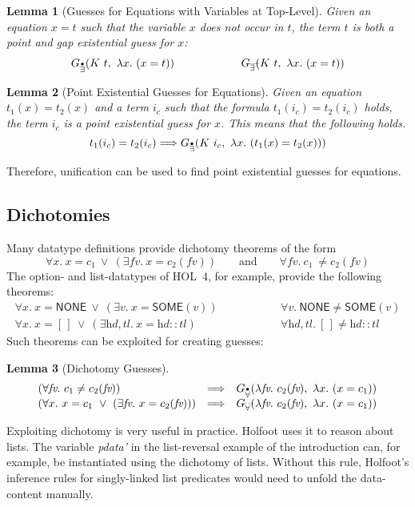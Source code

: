 \documentclass[a4paper,12pt,DIV=12,oneside]{scrbook}
\newcommand{\fv}{\textit{fv}}
\newtheorem{lemma}{Lemma}[section]
\theoremstyle{definition}
\theoremstyle{remark}
\newcommand{\GEP}{\ensuremath{G_{\accentset{\bullet}{\exists}}}}
\newcommand{\GEG}{\ensuremath{G_{\accentset{\_\,\_}{\exists}}}}
\newcommand{\GUP}{\ensuremath{G_{\accentset{\bullet}{\forall}}}}
\newcommand{\GUG}{\ensuremath{G_{\accentset{\_\,\_}{\forall}}}}
\begin{document}
\begin{lemma}[Guesses for Equations with Variables at Top-Level]\label{lemma_guesses_equation_top}
Given an equation $x = t$ such that the variable $x$ 
does not occur in $t$, the term $t$ is both a point and gap existential guess for
$x$:
\[%
\begin{array}{ccc}
\GEP(K\ t,\ \lambda x.\ (x = t)) & \qquad\qquad & \GEG(K\ t,\ \lambda x.\ (x = t)) \\
\end{array}
\]
\end{lemma}
%
\begin{lemma}[Point Existential Guesses for Equations]\label{lemma_guesses_equation_T}
Given an equation $t_1(x) = t_2(x)$ and a term $i_c$ such that 
the formula $t_1(i_c) = t_2(i_c)$ holds, the term $i_c$ is a point existential guess for
$x$. This means that the following holds.
\[
t_1(i_c) = t_2(i_c) \Longrightarrow
\GEP(K\ i_c,\ \lambda x.\ (t_1(x) = t_2(x)))
\]
\end{lemma}
\noindent
Therefore, unification can be used to find point existential guesses for equations.


\subsection{Dichotomies}\label{subsec_base_guesses_dichotomies}
Many datatype definitions provide dichotomy theorems of the form
\[
  \forall x.\ x = c_1\ \vee\ (\exists \fv.\ x = c_2(\fv)) \qquad \text{and} \qquad
  \forall \fv.\ c_1\ \neq c_2(\fv)
\]
The option- and list-datatypes of HOL~4, for example, provide the following theorems:
\[
\begin{array}{ccc}
  \forall x.\ x = \textsf{NONE}\ \vee\ (\exists v.\ x = \textsf{SOME}(v)) & \qquad \qquad &
  \forall v.\ \textsf{NONE} \neq \textsf{SOME}(v) \\

  \forall x.\ x = [\,]\ \vee\ (\exists \textit{hd}, \textit{tl}.\ x = \textit{hd}::\textit{tl}) & &
  \forall \textit{hd}, \textit{tl}.\ [\,] \neq \textit{hd}::\textit{tl}
\end{array}
\]
%
Such theorems can be exploited for creating guesses:
\begin{lemma}[Dichotomy Guesses]\label{lemma_guesses_dichotomy}
\[
\begin{array}{l@{\quad}l@{\quad}l}
(\forall \fv.\ c_1 \neq c_2(\fv)) & \Longrightarrow &
\GUP(\lambda \fv.\ c_2(\fv),\ \lambda x.\ (x = c_1)) \\

(\forall x.\ x = c_1\ \vee\ (\exists \fv.\ x = c_2(\fv))) & \Longrightarrow &
\GUG(\lambda \fv.\ c_2(\fv),\ \lambda x.\ (x = c_1)) 
\end{array}
\]
\end{lemma}
%
Exploiting dichotomy is very useful in practice. Holfoot uses it to reason about lists.
The variable \textit{pdata'} in the list-reversal example of the introduction can, for example,
be instantiated using the dichotomy of lists. Without this rule, Holfoot's inference rules for 
singly-linked list predicates would need to unfold the data-content manually.
\end{document}
